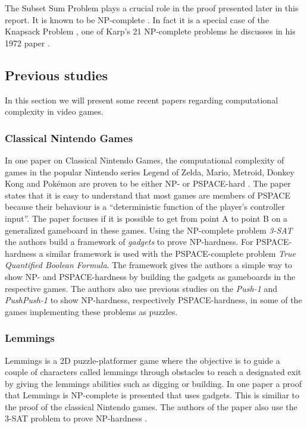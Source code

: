 The Subset Sum Problem plays a crucial role in the proof presented later in this report. It is known to be NP-complete \cite[p.~492]{algorithm}. In fact it is a special case of the Knapsack Problem \cite[p.~491]{algorithm}, one of Karp's 21 NP-complete problems he discusses in his 1972 paper \cite{karp}.

\subsection{Previous studies}

In this section we will present some recent papers regarding computational complexity in video games.

\subsubsection{Classical Nintendo Games}

In one paper on Classical Nintendo Games, the computational complexity of games in the popular Nintendo series Legend of Zelda, Mario, Metroid, Donkey Kong and Pokémon are proven to be either NP- or PSPACE-hard \cite{classic}. The paper states that it is easy to understand that most games are members of PSPACE because their behaviour is a ``deterministic function of the player's controller input''. The paper focuses if it is possible to get from point A to point B on a generalized gameboard in these games. Using the NP-complete problem \textit{3-SAT} the authors build a framework of \textit{gadgets} to prove NP-hardness. For PSPACE-hardness a similar framework is used with the PSPACE-complete problem \textit{True Quantified Boolean Formula}. The framework gives the authors a simple way to show NP- and PSPACE-hardness by building the gadgets as gameboards in the respective games. The authors also use previous studies on the \textit{Push-1} \cite{push1} and \textit{PushPush-1} \cite{pushpushk} to show NP-hardness, respectively PSPACE-hardness, in some of the games implementing these problems as puzzles. 

\subsubsection{Lemmings}

Lemmings is a 2D puzzle-platformer game where the objective is to guide a couple of characters called lemmings through obstacles to reach a designated exit by giving the lemmings abilities such as digging or building. In one paper a proof that Lemmings is NP-complete is presented that uses gadgets. This is similiar to the proof of the classical Nintendo games. The authors of the paper also use the 3-SAT problem to prove NP-hardness \cite{lemmings} . 

